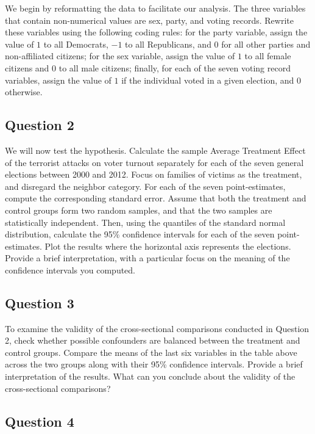 \documentclass[]{article}
\begin{document}
We begin by reformatting the data to facilitate our analysis. The three
variables that contain non-numerical values are sex, party, and voting
records. Rewrite these variables using the following coding rules: for
the party variable, assign the value of $1$ to all Democrats, $-1$ to
all Republicans, and $0$ for all other parties and non-affiliated
citizens; for the sex variable, assign the value of $1$ to all female
citizens and $0$ to all male citizens; finally, for each of the seven
voting record variables, assign the value of $1$ if the individual voted
in a given election, and $0$ otherwise.

\subsection{Question 2}\label{question-2}

We will now test the hypothesis. Calculate the sample Average Treatment
Effect of the terrorist attacks on voter turnout separately for each of
the seven general elections between 2000 and 2012. Focus on families of
victims as the treatment, and disregard the neighbor category. For each
of the seven point-estimates, compute the corresponding standard error.
Assume that both the treatment and control groups form two random
samples, and that the two samples are statistically independent. Then,
using the quantiles of the standard normal distribution, calculate the
95\% confidence intervals for each of the seven point-estimates. Plot
the results where the horizontal axis represents the elections. Provide
a brief interpretation, with a particular focus on the meaning of the
confidence intervals you computed.

\subsection{Question 3}\label{question-3}

To examine the validity of the cross-sectional comparisons conducted in
Question 2, check whether possible confounders are balanced between the
treatment and control groups. Compare the means of the last six
variables in the table above across the two groups along with their 95\%
confidence intervals. Provide a brief interpretation of the results.
What can you conclude about the validity of the cross-sectional
comparisons?

\subsection{Question 4}\label{question-4}
\end{document}
